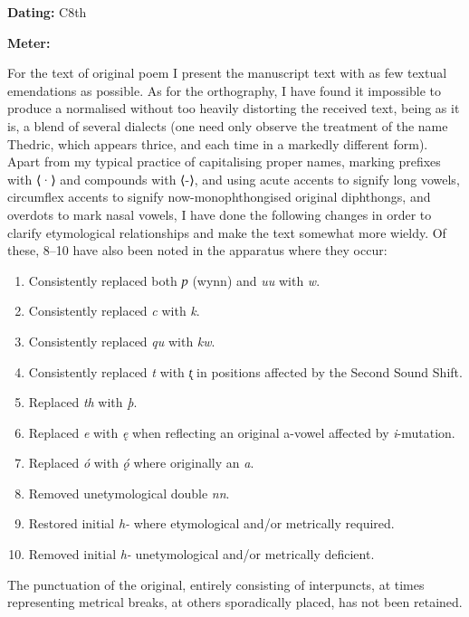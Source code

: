 
\begin{flushright}%
\textbf{Dating:} C8th

\textbf{Meter:} \Fornyrdislag%
\end{flushright}%


For the text of original poem I present the manuscript text with as few textual emendations as possible. As for the orthography, I have found it impossible to produce a normalised without too heavily distorting the received text, being as it is, a blend of several dialects (one need only observe the treatment of the name Thedric, which appears thrice, and each time in a markedly different form). Apart from my typical practice of capitalising proper names, marking prefixes with ⟨·⟩ and compounds with ⟨-⟩, and using acute accents to signify long vowels, circumflex accents to signify now-monophthongised original diphthongs, and overdots to mark nasal vowels, I have done the following changes in order to clarify etymological relationships and make the text somewhat more wieldy. Of these, 8–10 have also been noted in the apparatus where they occur:
\begin{enumerate}
  \item Consistently replaced both \emph{ƿ} (wynn) and \emph{uu} with \emph{w}.
  \item Consistently replaced \emph{c} with \emph{k}.
  \item Consistently replaced \emph{qu} with \emph{kw}.
  \item Consistently replaced \emph{t} with \emph{t̨} in positions affected by the Second Sound Shift.
  \item Replaced \emph{th} with \emph{þ}.
  \item Replaced \emph{e} with \emph{ę} when reflecting an original a-vowel affected by \emph{i}-mutation.
  \item Replaced \emph{ó} with \emph{ǫ́} where originally an \emph{a}.
  \item Removed unetymological double \emph{nn}.
  \item Restored initial \emph{h-} where etymological and/or metrically required.
  \item Removed initial \emph{h-} unetymological and/or metrically deficient.
\end{enumerate}

The punctuation of the original, entirely consisting of interpuncts, at times representing metrical breaks, at others sporadically placed, has not been retained.

